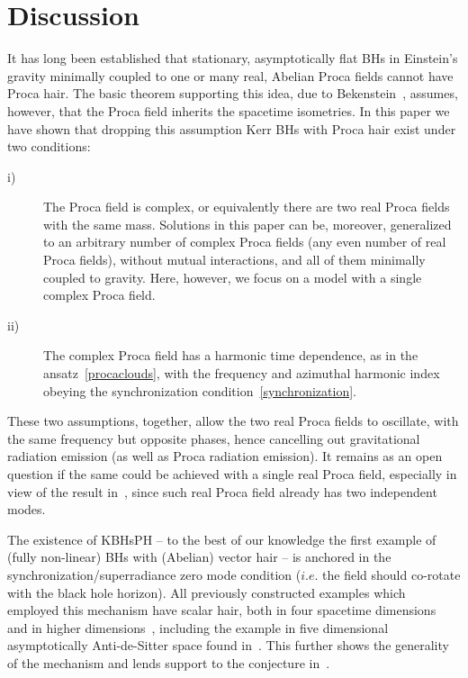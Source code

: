 \section{Discussion}
\label{sec_discussion}
It has long been established that stationary, asymptotically flat BHs in Einstein's gravity minimally coupled to one or many real, Abelian Proca fields cannot have Proca hair. The basic theorem supporting this idea, due to Bekenstein~\cite{Bekenstein:1971hc,Bekenstein:1972ky}, assumes, however, that the Proca field inherits the spacetime isometries. In this paper we have shown that dropping this assumption Kerr BHs with Proca hair exist under two conditions:
\begin{description}
\item[i)] The Proca field is complex, or equivalently there are two real Proca fields with the same mass. Solutions in this paper can be, moreover, generalized to an arbitrary number of complex Proca fields (any even number of real Proca fields), without mutual interactions, and all of them minimally coupled to gravity. Here, however, we focus on a model with a single complex Proca field. 
\item[ii)] The complex Proca field has a harmonic time dependence, as in the ansatz~\eqref{procaclouds}, with the frequency and azimuthal harmonic index obeying the synchronization condition~\eqref{synchronization}.
\end{description}
These two assumptions, together, allow the two real Proca fields to oscillate, with the same frequency but opposite phases, hence cancelling out gravitational radiation emission (as well as Proca radiation emission). It remains as an open question if the same could be achieved with a single real Proca field, especially in view of the result in~\cite{Wang:2015fgp}, since such real Proca field already has two independent modes. 

\bigskip

The existence of  KBHsPH -- to the best of our knowledge the first example of (fully non-linear)   
BHs with (Abelian) vector hair -- is anchored  in the synchronization/superradiance zero mode condition
($i.e.$ the field should co-rotate with the  black hole horizon). 
%
All previously constructed examples which employed this mechanism have scalar hair, 
both in four spacetime dimensions~\cite{Herdeiro:2014goa,Herdeiro:2015gia,Kleihaus:2015iea,Herdeiro:2015tia} and in higher dimensions~\cite{Brihaye:2014nba,Herdeiro:2015kha}, 
including the example in five dimensional asymptotically Anti-de-Sitter space found in~\cite{Dias:2011at}. 
This further shows the generality of the mechanism and lends support to the conjecture in~\cite{Herdeiro:2014goa,Herdeiro:2014ima}.


